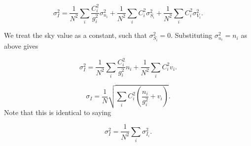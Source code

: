 \documentclass[../main.tex]{subfiles}
\begin{document}
\begin{equation}
  \sigma_I^2 = \frac{1}{N^2}\sum_i\frac{C_i^2}{g_i^2}\sigma_{n_i}^2 + \frac{1}{N^2}\sum_i C_i^2 \sigma_{S_i}^2 + \frac{1}{N^2}\sum_i C_i^2 \sigma_{V_i}^2.
\end{equation}

We treat the sky value as a constant, such that $\sigma_{S_i}^2 = 0$. Substituting $\sigma_{n_i}^2 = n_i$ as above gives

\begin{equation}
  \sigma_I^2 = \frac{1}{N^2}\sum_i\frac{C_i^2}{g_i^2}n_i + \frac{1}{N^2}\sum_i C_i^2 v_i.
\end{equation}

\begin{equation}
  \sigma_I = \frac{1}{N}\sqrt{\sum_i C_i^2\left(\frac{n_i}{g_i^2} + v_i\right)}.
\end{equation}
Note that this is identical to saying

\begin{equation}
\sigma_I^2 = \frac{1}{N^2}\sum_i\sigma_{I_i}^2.
\end{equation}
\end{document}
